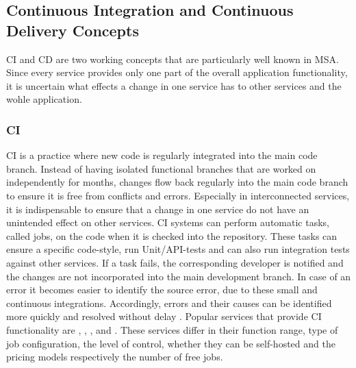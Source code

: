 \documentclass[12pt, a4paper]{article}
\begin{document}
    \subsection{Continuous Integration and Continuous Delivery Concepts}\label{ssec::ci_cd}
    \acl{CI} and \acl{CD} are two working concepts that are particularly well known in \ac{MSA}. Since every service provides only one part of the overall application functionality, it is uncertain what effects a change in one service has to other services and the wohle application.

    \subsubsection{\acl{CI}}
    \acl{CI} is a practice where new code is regularly integrated into the main code branch. Instead of having isolated functional branches that are worked on independently for months, changes flow back regularly into the main code branch to ensure it is free from conflicts and errors. Especially in interconnected services, it is indispensable to ensure that a change in one service do not have an unintended effect on other services. \ac{CI} systems can perform automatic tasks, called jobs, on the code when it is checked into the repository. These tasks can ensure a specific code-style, run Unit/\acs{API}-tests and can also run integration tests against other services. If a task fails, the corresponding developer is notified and the changes are not incorporated into the main development branch. In case of an error it becomes easier to identify the source error, due to these small and continuous integrations. Accordingly, errors and their causes can be identified more quickly and resolved without delay \cite{azuredevops}.\newline
    Popular services that provide \acl{CI} functionality are , , ,  and . These services differ in their function range, type of job configuration, the level of control, whether they can be self-hosted and the pricing models respectively the number of free jobs.
\end{document}
